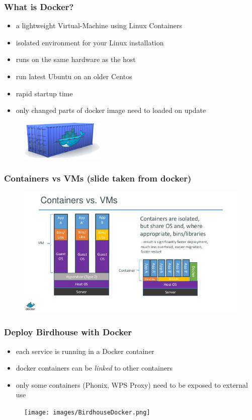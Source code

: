 \documentclass{beamer}
\begin{document}
  \begin{frame}
    \frametitle{What is Docker?}
    \begin{itemize}
      \item a lightweight Virtual-Machine using Linux Containers
      \item isolated environment for your Linux installation
      \item runs on the same hardware as the host
      \item run latest Ubuntu on an older Centos
      \item rapid startup time
      \item only changed parts of docker image need to loaded on update
    \end{itemize}
    \begin{figure}
      \includegraphics[width=4cm]{images/docker-container.png}
    \end{figure}
  \end{frame}


  \begin{frame}
    \frametitle{Containers vs VMs (slide taken from docker)}
    \begin{figure}
      \includegraphics[width=11.5cm]{images/docker-vs-vms.jpg}
    \end{figure}
  \end{frame}


  \begin{frame}[plain]
    \frametitle{Deploy Birdhouse with Docker}
    \begin{itemize}
      \item each service is running in a Docker container
      \item docker containers can be \emph{linked} to other containers
      \item only some containers (Phonix, WPS Proxy) need to be exposed to external use
    \end{itemize}
    \begin{figure}
      \texttt{[image: images/BirdhouseDocker.png]}
    \end{figure}
  \end{frame}
\end{document}
